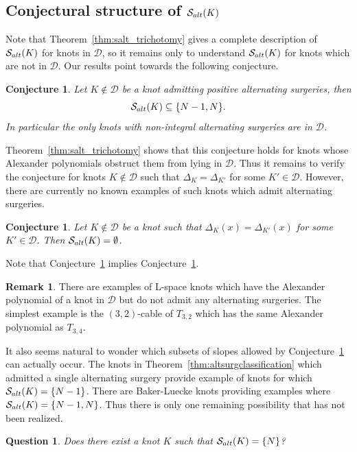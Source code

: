 \documentclass{amsart} %
\newcommand{\D}{\mathcal{D}}
\newcommand{\Salt}{\mathcal{S}_{\rm alt}}
\theoremstyle{thm}
\newtheorem{con}[Theorem]{Conjecture}
\newtheorem{ques}[Theorem]{Question}
\theoremstyle{definition}
\newtheorem{rem}[Theorem]{Remark}
\newcommand{\dunc}[1]{{\color{amethyst} #1}}
\numberwithin{equation}{section}
\begin{document}
\subsection{Conjectural structure of \texorpdfstring{$\Salt(K)$}{Salt(K)}}
Note that Theorem~\ref{thm:salt_trichotomy} gives a complete description of $\Salt(K)$ for knots in $\D$, so it remains only to understand $\Salt(K)$ for knots which are not in $\D$. Our results point towards the following conjecture.
\begin{con}\label{conj:atmosttwoslopes}
Let $K\notin \D$ be a knot admitting positive alternating surgeries, then
\[\Salt(K)\subseteq \{N-1,N\}.\]
In particular the only knots with non-integral alternating surgeries are in $\D$.
\end{con}

Theorem~\ref{thm:salt_trichotomy} shows that this conjecture holds for knots whose Alexander polynomials obstruct them from lying in $\D$. Thus it remains to verify the conjecture for knots $K\notin \D$ such that $\Delta_K=\Delta_{K'}$ for some $K'\in \D$. However, there are currently no known examples of such knots which admit alternating surgeries.

\begin{con}\label{conj:strong_conj}
Let $K\notin \D$ be a knot such that $\Delta_K(x)=\Delta_{K'}(x)$ for some $K'\in \D$. Then $\Salt(K)=\emptyset$.
\end{con}
Note that Conjecture~\ref{conj:strong_conj} implies Conjecture~\ref{conj:atmosttwoslopes}. 
\begin{rem}
    There are examples of L-space knots which have the Alexander polynomial of a knot in $\D$ but do not admit any alternating surgeries. The simplest example is the $(3,2)$-cable of $T_{3,2}$ which has the same Alexander polynomial as $T_{3,4}$. %
\end{rem}

It also seems natural to wonder which subsets of slopes allowed by Conjecture~\ref{conj:atmosttwoslopes} can actually occur. The knots in Theorem~\ref{thm:altsurgclassification} which admitted a single alternating surgery provide example of knots for which $\Salt(K)=\{N-1\}$. There are Baker-Luecke knots providing examples where $\Salt(K)=\{N-1,N\}$. Thus there is only one remaining possibility that has not been realized.
\begin{ques}\label{ques:N}
    Does there exist a knot $K$ such that $\Salt(K)=\{N\}$?
\end{ques}
\end{document}
